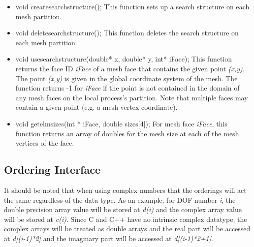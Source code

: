 \begin{itemize}
\item void createsearchstructure(); This function sets up a search structure on each mesh partition.  
\item void deletesearchstructure(); This function deletes the search structure on each mesh partition.
\item void usesearchstructure(double* x, double* y, int* iFace); This function returns the face ID \textit{iFace}
of a mesh face that contains the given point \textit{(x,y)}.  The point \textit{(x,y)} is given in the
global coordinate system of the mesh.  The function returns -1 for \textit{iFace} if the point is not contained
in the domain of any mesh faces on the local process's partition.  Note  that multiple faces may contain
a given point (e.g. a mesh vertex coordinate).
\item void getelmsizes(int * iFace, double sizes[4]); For mesh face \textit{iFace}, this function returns an array
of doubles for the mesh size at each of the mesh vertices of the face.  
\end{itemize}





\subsection{Ordering Interface}
It should be noted that when using complex numbers that the orderings will act the same regardless
of the data type. As an example, for DOF number \textit{i}, the double precision array value will 
be stored at \textit{d(i)} and the complex array value will be stored at \textit{c(i)}.  Since
C and C++ have no intrinsic complex datatype, the complex arrays will be treated as double arrays
and the real part will be accessed at \textit{d[(i-1)*2]} and the imaginary part will be
accessed at \textit{d[(i-1)*2+1]}.

